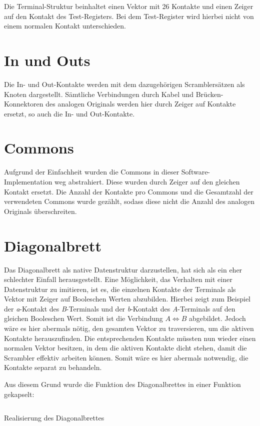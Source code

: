 Die Terminal-Struktur beinhaltet einen Vektor mit 26 Kontakte und einen Zeiger auf den Kontakt des Test-Registers.
Bei dem Test-Register wird hierbei nicht von einem \glqq normalen\grqq{} Kontakt unterschieden.

\section{In und Outs}\label{subsec:impl_in_und_outs}
Die In- und Out-Kontakte werden mit dem dazugehörigen Scramblersätzen als Knoten dargestellt.
Sämtliche Verbindungen durch Kabel und Brücken-Konnektoren des analogen Originals werden hier durch Zeiger auf Kontakte ersetzt, so auch die In- und Out-Kontakte.

\section{Commons}\label{subsec:impl_commons}
Aufgrund der Einfachheit wurden die Commons in dieser Software-Imple\-men\-tation \glqq weg abstrahiert\grqq.
Diese wurden durch Zeiger auf den gleichen Kontakt ersetzt.
Die Anzahl der Kontakte pro Commons und die Gesamtzahl der verwendeten Commons wurde gezählt, sodass diese nicht die Anzahl des analogen Originals überschreiten.

\section{Diagonalbrett}\label{subsec:impl_diagonal_board}
Das Diagonalbrett als native Datenstruktur darzustellen, hat sich als ein eher schlechter Einfall herausgestellt.
Eine Möglichkeit, das Verhalten mit einer Datenstruktur zu imitieren, ist es, die einzelnen Kontakte der Terminals als Vektor mit Zeiger auf Booleschen Werten abzubilden.
Hierbei zeigt zum Beispiel der \emph{a}-Kontakt des \emph{B}-Terminals und der \emph{b}-Kontakt des \emph{A}-Terminals auf den gleichen Booleschen Wert.
Somit ist die Verbindung $A \Leftrightarrow B$ abgebildet.
Jedoch wäre es hier abermals nötig, den gesamten Vektor zu traversieren, um die aktiven Kontakte herauszufinden.
Die entsprechenden Kontakte müssten nun wieder einen normalen Vektor besitzen, in dem die aktiven Kontakte \glqq dicht\grqq{} stehen, damit die Scrambler effektiv arbeiten können.
Somit wäre es hier abermals notwendig, die Kontakte separat zu behandeln.

Aus diesem Grund wurde die Funktion des Diagonalbrettes in einer Funktion gekapselt:

\begin{mylisting}
	\inputminted{C}{Implementierung/diag_method.c}
	\caption{Realisierung des Diagonalbrettes}
	\label{code_impl_diag_board}
\end{mylisting}

